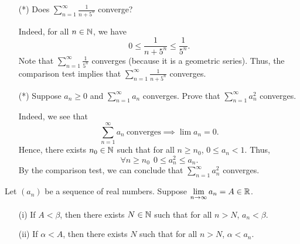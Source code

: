 \documentclass[a4paper]{article}
\begin{document}
\begin{eg}
    \begin{enumerate}
        \item[(*)] Does \( \sum_{ n=1  }^{ \infty  } \frac{ 1 }{ n + 5^{n } }  \) converge?

            Indeed, for all \( n \in \mathbb{N} \), we have 
            \[  0 \leq \frac{ 1 }{ n+5^{n} }  \leq \frac{ 1 }{ 5^{n} }. \]
            Note that \( \sum_{ n=1  }^{ \infty  } \frac{ 1 }{ 5^{n} }  \) converges (because it is a geometric series). Thus, the comparison test implies that 
\( \sum_{ n=1  }^{ \infty  } \frac{ 1 }{ n+ 5^{n} }  \) converges.

        \item[(*)] Suppose \( {a}_{n } \geq 0 \) and \( \sum_{ n=1  }^{ \infty  } {a}_{n} \) converges. Prove that \( \sum_{ n=1  }^{ \infty  } {a}_{n}^{2} \) converges. 

            Indeed, we see that 
            \[  \sum_{ n=1  }^{ \infty  } {a}_{n} \ \text{converges}  \implies \lim {a}_{n} = 0.  \]
            Hence, there exists \( {n}_{0} \in \mathbb{N}  \) such that for all \( n \geq {n}_{0} \), \( 0 \leq {a}_{n} < 1  \). Thus, 
            \[  \forall n \geq {n}_{0} \ \ 0 \leq {a}_{n}^{2} \leq {a}_{n}. \]
            By the comparison test, we can conclude that \( \sum_{ n=1  }^{ \infty  } {a}_{n}^{2}  \) converges.
    \end{enumerate}
\end{eg}

\begin{remark}
    Let \( ({a}_{n}) \) be a sequence of real numbers. Suppose \( \lim_{ n \to \infty  }  {a}_{n} = A \in \R  \).
    \begin{enumerate}
        \item[(i)] If \( A < \beta \), then there exists \( N \in \mathbb{N}  \) such that for all \( n > N  \), \( {a}_{n} < \beta \).
        \item[(ii)] If \( \alpha < A  \), then there exists \( N  \) such that for all \( n > N  \), \( \alpha < {a}_{n} \).
    \end{enumerate}
\end{remark}
\end{document}
